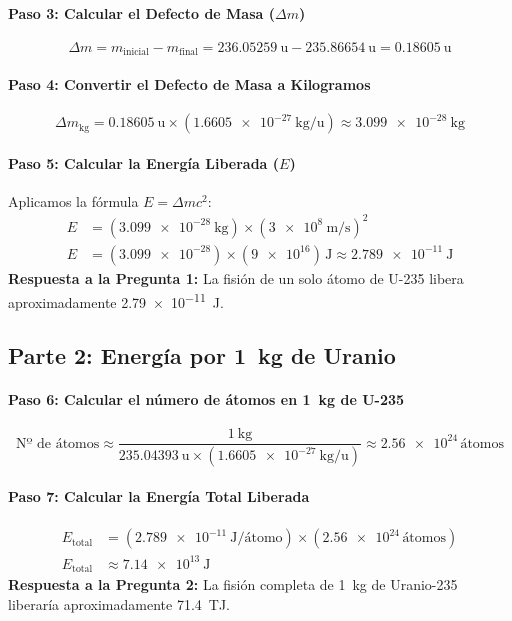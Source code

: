 \documentclass[11pt,a4paper]{book}
\begin{document}
\paragraph{Paso 3: Calcular el Defecto de Masa ($\Delta m$)}
\[ \Delta m = m_{\text{inicial}} - m_{\text{final}} = \SI{236.05259}{\atomicmassunit} - \SI{235.86654}{\atomicmassunit} = \SI{0.18605}{\atomicmassunit} \]

\paragraph{Paso 4: Convertir el Defecto de Masa a Kilogramos}
\[ \Delta m_{\text{kg}} = \SI{0.18605}{\atomicmassunit} \times (\SI{1.6605e-27}{\kilo\gram\per\atomicmassunit}) \approx \SI{3.099e-28}{\kilo\gram} \]

\paragraph{Paso 5: Calcular la Energía Liberada ($E$)}
Aplicamos la fórmula $E = \Delta m c^2$:
\begin{align*}
    E &= (\SI{3.099e-28}{\kilo\gram}) \times (\SI{3e8}{\meter\per\second})^2 \\
    E &= (\SI{3.099e-28}) \times (\SI{9e16}) \, \si{\joule} \approx \SI{2.789e-11}{\joule}
\end{align*}
\textbf{Respuesta a la Pregunta 1:} La fisión de un solo átomo de U-235 libera aproximadamente \SI{2.79e-11}{\joule}.

\subsection*{Parte 2: Energía por \SI{1}{\kilo\gram} de Uranio}

\paragraph{Paso 6: Calcular el número de átomos en \SI{1}{\kilo\gram} de U-235}
\[ \text{Nº de átomos} \approx \frac{\SI{1}{\kilo\gram}}{\SI{235.04393}{\atomicmassunit} \times (\SI{1.6605e-27}{\kilo\gram\per\atomicmassunit})} \approx \num{2.56e24} \, \text{átomos} \]

\paragraph{Paso 7: Calcular la Energía Total Liberada}
\begin{align*}
    E_{\text{total}} &= (\SI{2.789e-11}{\joule\per\text{átomo}}) \times (\num{2.56e24} \, \text{átomos}) \\
    E_{\text{total}} &\approx \SI{7.14e13}{\joule}
\end{align*}
\textbf{Respuesta a la Pregunta 2:} La fisión completa de \SI{1}{\kilo\gram} de Uranio-235 liberaría aproximadamente \SI{71.4}{\tera\joule}.
\end{document}
